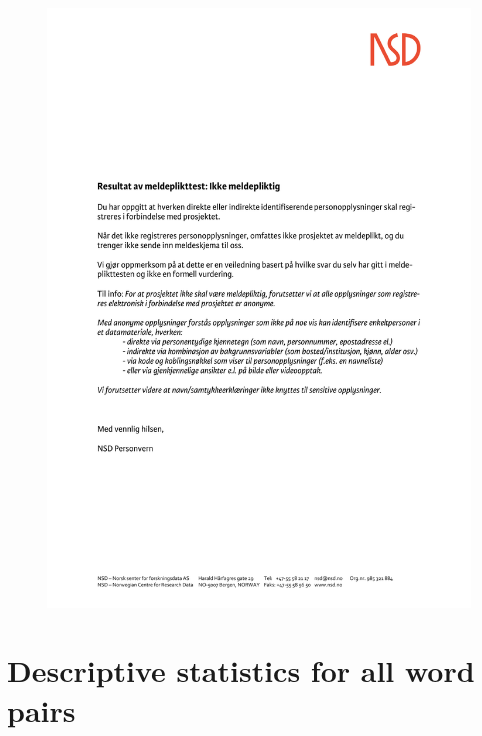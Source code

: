  \begin{figure}
        \centering
        \includegraphics[scale=0.65]{figures/ikke_meldepliktig.pdf}
        \label{fig:ikkemeld}
    \end{figure}

\section{Descriptive statistics for all word pairs}
        \label{desstat}

